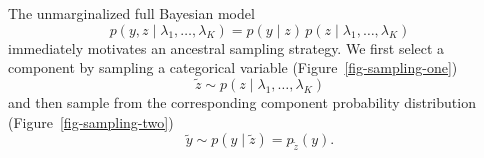 \documentclass[
  letterpaper,
  DIV=11,
  numbers=noendperiod]{scrartcl}
\begin{document}
The unmarginalized full Bayesian model \[
p(y, z \mid \lambda_{1}, \ldots, \lambda_{K})
=
p(y \mid z) \, p(z \mid \lambda_{1}, \ldots, \lambda_{K})
\] immediately motivates an ancestral sampling strategy. We first select
a component by sampling a categorical variable
(Figure~\ref{fig-sampling-one}) \[
\tilde{z} \sim p(z \mid \lambda_{1}, \ldots, \lambda_{K})
\] and then sample from the corresponding component probability
distribution (Figure~\ref{fig-sampling-two}) \[
\tilde{y} \sim p(y \mid \tilde{z}) = p_{\tilde{z}}(y).
\]

\begin{figure}

\begin{minipage}{0.05\linewidth}
~\end{minipage}%
%
\begin{minipage}{0.45\linewidth}


\subcaption{\label{fig-sampling-one}}

\end{minipage}%
%
\begin{minipage}{0.45\linewidth}

\centering{

}
\end{minipage}
\end{figure}
\end{document}
